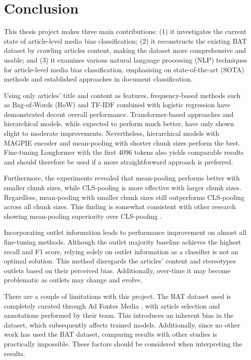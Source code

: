 \chapter{Conclusion}
\label{cha:6}

This thesis project makes three main contributions: (1) it investigates the current state of article-level media bias classification; (2) it reconstructs the existing BAT dataset by crawling articles content, making the dataset more comprehensive and usable; and (3) it examines various natural language processing (NLP) techniques for article-level media bias classification, emphasising on state-of-the-art (SOTA) methods and established approaches in document classification.

Using only articles' title and content as features, frequency-based methods such as Bag-of-Words (BoW) and TF-IDF combined with logistic regression have demonstrated decent overall performance. Transformer-based approaches and hierarchical models, while expected to perform much better, have only shown slight to moderate improvements. Nevertheless, hierarchical models with MAGPIE encoder and mean-pooling with shorter chunk sizes perform the best. Fine-tuning Longformer with the first 4096 tokens also yields comparable results and should therefore be used if a more straightforward approach is preferred.

Furthermore, the experiments revealed that mean-pooling performs better with smaller chunk sizes, while CLS-pooling is more effective with larger chunk sizes. Regardless, mean-pooling with smaller chunk sizes still outperforms CLS-pooling across all chunk sizes. This finding is somewhat consistent with other research showing mean-pooling superiority over CLS-pooling \cite{rodrigo-2024-systematic-review-media-bias}.

Incorporating outlet information leads to performance improvement on almost all fine-tuning methods. Although the outlet majority baseline achieves the highest recall and F1 score, relying solely on outlet information as a classifier is not an optimal solution. This method disregards the articles' content and stereotypes outlets based on their perceived bias. Additionally, over-time it may become problematic as outlets may change and evolve.

There are a couple of limitations with this project. The BAT dataset used is completely curated through Ad Fontes Media \cite{adfontes}, with article selection and annotations performed by their team. This introduces an inherent bias in the dataset, which subsequently affects trained models. Additionally, since no other work has used the BAT dataset, comparing results with other studies is practically impossible. These factors should be considered when interpreting the results.

